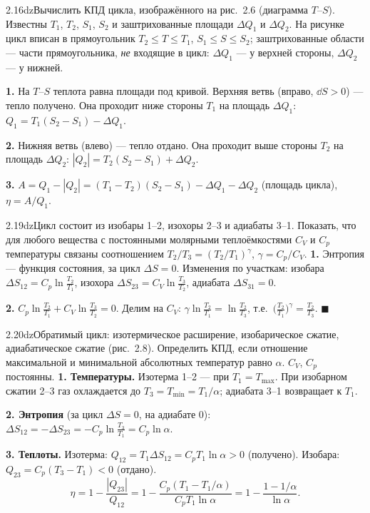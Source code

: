 \begin{problem}{2.16}{dz}{Вычислить КПД цикла, изображённого на рис.~2.6 (диаграмма $T$--$S$). Известны $T_1$, $T_2$, $S_1$, $S_2$ и заштрихованные площади
$\Delta Q_1$ и $\Delta Q_2$.}
На рисунке цикл вписан в прямоугольник $T_2\le T\le T_1$, $S_1\le S\le S_2$; заштрихованные области — части прямоугольника, \emph{не} входящие в цикл:
$\Delta Q_1$ — у верхней стороны, $\Delta Q_2$ — у нижней.

\textbf{1.} На $T$--$S$ теплота равна площади под кривой. Верхняя ветвь (вправо, $\dd S>0$) — тепло получено. Она проходит ниже стороны $T_1$ на площадь $\Delta Q_1$:
$Q_1=T_1(S_2-S_1)-\Delta Q_1$.

\textbf{2.} Нижняя ветвь (влево) — тепло отдано. Она проходит выше стороны $T_2$ на площадь $\Delta Q_2$:
$|Q_2|=T_2(S_2-S_1)+\Delta Q_2$.

\textbf{3.} $A=Q_1-|Q_2|=(T_1-T_2)(S_2-S_1)-\Delta Q_1-\Delta Q_2$ (площадь цикла), $\eta=A/Q_1$.
\end{problem}

\begin{problem}{2.19}{dz}{Цикл состоит из изобары 1--2, изохоры 2--3 и адиабаты 3--1. Показать, что для любого вещества с постоянными молярными теплоёмкостями
$C_V$ и $C_p$ температуры связаны соотношением $T_2/T_3=(T_2/T_1)^\gamma$, $\gamma=C_p/C_V$.}
\textbf{1.} Энтропия — функция состояния, за цикл $\Delta S=0$. Изменения по участкам:
изобара $\Delta S_{12}=C_p\ln\frac{T_2}{T_1}$, изохора $\Delta S_{23}=C_V\ln\frac{T_3}{T_2}$, адиабата $\Delta S_{31}=0$.

\textbf{2.} $C_p\ln\frac{T_2}{T_1}+C_V\ln\frac{T_3}{T_2}=0$. Делим на $C_V$: $\gamma\ln\frac{T_2}{T_1}=\ln\frac{T_2}{T_3}$, т.е.\
$\big(\frac{T_2}{T_1}\big)^\gamma=\frac{T_2}{T_3}$. \hfill$\blacksquare$
\end{problem}

\begin{problem}{2.20}{dz}{Обратимый цикл: изотермическое расширение, изобарическое сжатие, адиабатическое сжатие (рис.~2.8).
Определить КПД, если отношение максимальной и минимальной абсолютных температур равно $\alpha$. $C_V$, $C_p$ постоянны.}
\textbf{1. Температуры.} Изотерма 1--2 — при $T_1=T_{\max}$. При изобарном сжатии 2--3 газ охлаждается до $T_3=T_{\min}=T_1/\alpha$; адиабата 3--1 возвращает к $T_1$.

\textbf{2. Энтропия} (за цикл $\Delta S=0$, на адиабате $0$): $\Delta S_{12}=-\Delta S_{23}=-C_p\ln\frac{T_3}{T_1}=C_p\ln\alpha$.

\textbf{3. Теплоты.} Изотерма: $Q_{12}=T_1\Delta S_{12}=C_pT_1\ln\alpha>0$ (получено). Изобара: $Q_{23}=C_p(T_3-T_1)<0$ (отдано).
\[\eta=1-\frac{|Q_{23}|}{Q_{12}}=1-\frac{C_p(T_1-T_1/\alpha)}{C_pT_1\ln\alpha}=1-\frac{1-1/\alpha}{\ln\alpha}.\]
\answer{$\eta=1-\dfrac{\alpha-1}{\alpha\ln\alpha}$.}
\end{problem}

